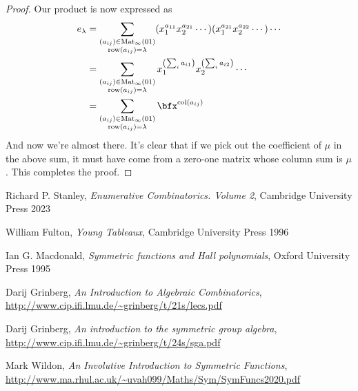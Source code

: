 \documentclass{article}
\DeclareMathOperator{\row}{row}
\DeclareMathOperator{\col}{col}
\DeclareMathOperator{\Mat}{Mat}
\begin{document}
\begin{proof}
    Our product is now expressed as
    \begin{align*}
        e_\lambda 
        &=
        \sum_{\substack{(a_{ij})\in\Mat_\infty(01)\\\row(a_{ij}) = \lambda}} (x_1^{a_{11}}x_2^{a_{21}}\cdots)(x_1^{a_{21}}x_2^{a_{22}}\cdots)\cdots \\
        &= 
        \sum_{\substack{(a_{ij})\in\Mat_\infty(01)\\\row(a_{ij}) = \lambda}} x_1^{\left(\sum_i a_{i1}\right)}x_2^{\left(\sum_i a_{i2}\right)} \cdots \\
        &= 
        \sum_{\substack{(a_{ij})\in\Mat_\infty(01)\\\row(a_{ij}) = \lambda}} \bfx^{\col(a_{ij})}
    \end{align*}
    And now we're almost there.
    It's clear that if we pick out the coefficient of $\mu$ in the above sum, it must have come from a zero-one matrix whose column sum is $\mu$.
    This completes the proof.
\end{proof}


\begin{thebibliography}{999999}
    \raggedright\footnotesize

    Richard P. Stanley, 
    \textit{Enumerative Combinatorics. Volume 2}, 
    Cambridge University Press 2023

    William Fulton, 
    \textit{Young Tableaux}, 
    Cambridge University Press 1996

    Ian G. Macdonald,
    \textit{Symmetric functions and Hall polynomials}, 
    Oxford University Press 1995

    Darij Grinberg, 
    \textit{An Introduction to Algebraic Combinatorics}, 
    \url{http://www.cip.ifi.lmu.de/~grinberg/t/21s/lecs.pdf}

    Darij Grinberg, 
    \textit{An introduction to the symmetric group algebra}, 
    \url{http://www.cip.ifi.lmu.de/~grinberg/t/24s/sga.pdf}

    Mark Wildon, 
    \textit{An Involutive Introduction to Symmetric Functions},
    \url{http://www.ma.rhul.ac.uk/~uvah099/Maths/Sym/SymFuncs2020.pdf}
\end{thebibliography}
\end{document}
